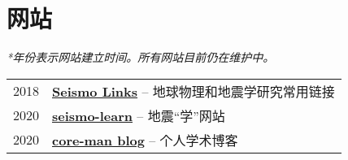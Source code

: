 \section*{网站}

\textit{*年份表示网站建立时间。所有网站目前仍在维护中。}

\begin{tabular}{p{} p{}}
2018 &	\textbf{\href{https://seismo-learn.org/links/}{Seismo Links}} -- 地球物理和地震学研究常用链接 \\
2020 &	\textbf{\href{https://seismo-learn.org/}{seismo-learn}} -- 地震“学”网站 \\
2020 &	\textbf{\href{https://core-man.github.io/blog/}{core-man blog}} -- 个人学术博客 \\
\end{tabular}
